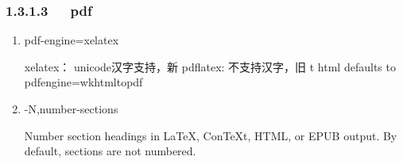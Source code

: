 \documentclass[letterpaper,12pt,english]{sphinxmanual}
\begin{document}
\begin{enumerate}
\begin{itemize}
\end{itemize}

\end{enumerate}


\subsubsection{1.3.1.3   pdf}
\label{\detokenize{001software/001install/pandoc:pdf}}\begin{enumerate}
%
\item {} 
\textendash{}pdf-engine=xelatex

\begin{sphinxVerbatim}[commandchars=\\\{\}]
xelatex： unicode汉字支持，新
pdflatex: 不支持汉字，旧
\PYGZhy{}t html defaults to \PYGZhy{}\PYGZhy{}pdf\PYGZhy{}engine=wkhtmltopdf
\end{sphinxVerbatim}

\item {} 
-N,\textendash{}number-sections

Number section headings in LaTeX, ConTeXt, HTML, or EPUB output. By
default, sections are not numbered.

\end{enumerate}
\end{document}
